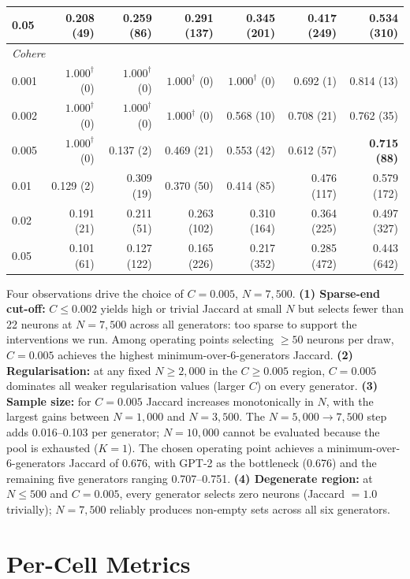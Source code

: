 \documentclass[11pt]{article}
\begin{document}
\begin{table}[!htbp]
\begin{tabular}{lrrrrrr}
0.05  & 0.208 (49)  & 0.259 (86)  & 0.291 (137) & 0.345 (201) & 0.417 (249) & 0.534 (310) \\
\midrule
\multicolumn{7}{l}{\textit{Cohere}} \\
0.001 & $1.000^\dagger$ (0)  & $1.000^\dagger$ (0)  & $1.000^\dagger$ (0)  & $1.000^\dagger$ (0)  & 0.692 (1)   & 0.814 (13) \\
0.002 & $1.000^\dagger$ (0)  & $1.000^\dagger$ (0)  & $1.000^\dagger$ (0)  & 0.568 (10)  & 0.708 (21)  & 0.762 (35) \\
0.005 & $1.000^\dagger$ (0)  & 0.137 (2)   & 0.469 (21)  & 0.553 (42)  & 0.612 (57)  & \textbf{0.715 (88)} \\
0.01  & 0.129 (2)   & 0.309 (19)  & 0.370 (50)  & 0.414 (85)  & 0.476 (117) & 0.579 (172) \\
0.02  & 0.191 (21)  & 0.211 (51)  & 0.263 (102) & 0.310 (164) & 0.364 (225) & 0.497 (327) \\
0.05  & 0.101 (61)  & 0.127 (122) & 0.165 (226) & 0.217 (352) & 0.285 (472) & 0.443 (642) \\
\bottomrule
\end{tabular}
\end{table}

Four observations drive the choice of $C=0.005$, $N=7{,}500$. \textbf{(1) Sparse-end cut-off:} $C \leq 0.002$ yields high or trivial Jaccard at small $N$ but selects fewer than 22 neurons at $N=7{,}500$ across all generators: too sparse to support the interventions we run. Among operating points selecting $\geq 50$ neurons per draw, $C=0.005$ achieves the highest minimum-over-6-generators Jaccard. \textbf{(2) Regularisation:} at any fixed $N \geq 2{,}000$ in the $C \geq 0.005$ region, $C=0.005$ dominates all weaker regularisation values (larger $C$) on every generator. \textbf{(3) Sample size:} for $C=0.005$ Jaccard increases monotonically in $N$, with the largest gains between $N=1{,}000$ and $N=3{,}500$. The $N=5{,}000 \to 7{,}500$ step adds 0.016--0.103 per generator; $N=10{,}000$ cannot be evaluated because the pool is exhausted ($K=1$). The chosen operating point achieves a minimum-over-6-generators Jaccard of 0.676, with GPT-2 as the bottleneck (0.676) and the remaining five generators ranging 0.707--0.751. \textbf{(4) Degenerate region:} at $N \leq 500$ and $C=0.005$, every generator selects zero neurons (Jaccard $=1.0$ trivially); $N=7{,}500$ reliably produces non-empty sets across all six generators.

\section{Per-Cell Metrics}
\label{app:per-cell}
\end{document}
